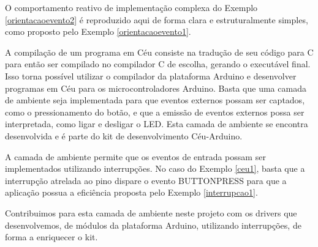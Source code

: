 \documentclass[11pt]{article}
\begin{document}
\par O comportamento reativo de implementação complexa do Exemplo \ref{orientacaoevento2} é reproduzido aqui de forma clara e estruturalmente simples, como proposto pelo Exemplo \ref{orientacaoevento1}.
\par A compilação de um programa em Céu consiste na tradução de seu código para C para então ser compilado no compilador C de escolha, gerando o executável final. Isso torna possível utilizar o compilador da plataforma Arduino e desenvolver programas em Céu para os microcontroladores Arduino. Basta que uma camada de ambiente seja implementada para que eventos externos possam ser captados, como o pressionamento do botão, e que a emissão de eventos externos possa ser interpretada, como ligar e desligar o LED. Esta camada de ambiente se encontra desenvolvida e é parte do kit de desenvolvimento Céu-Arduino\cite{githubceuarduino}.
\par A camada de ambiente permite que os eventos de entrada possam ser implementados utilizando interrupções. No caso do Exemplo \ref{ceu1}, basta que a interrupção atrelada ao pino dispare o evento BUTTON\textunderscore PRESS para que a aplicação possua a eficiência proposta pelo Exemplo \ref{interrupcao1}.
\par Contribuimos para esta camada de ambiente neste projeto com os drivers que desenvolvemos, de módulos da plataforma Arduino, utilizando interrupções, de forma a enriquecer o kit.
\end{document}
